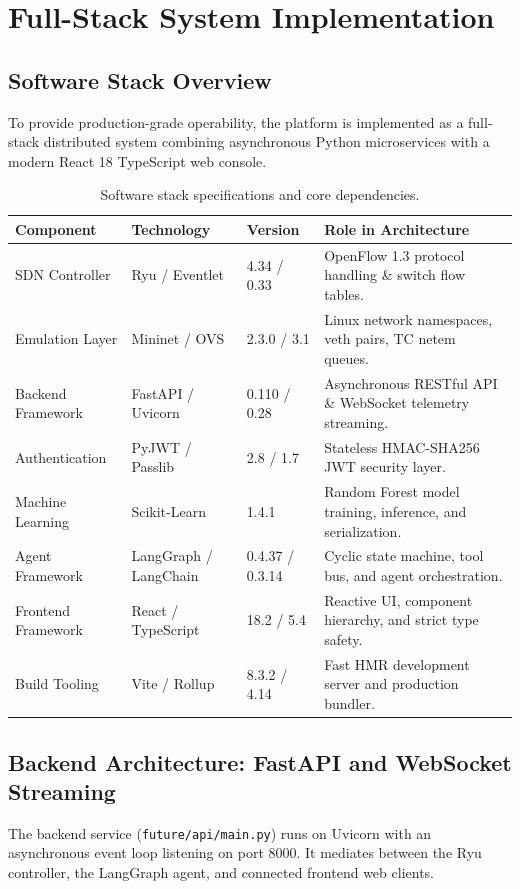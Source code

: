 \chapter{Full-Stack System Implementation}
\label{ch:implementation}

\section{Software Stack Overview}
To provide production-grade operability, the platform is implemented as a full-stack distributed system combining asynchronous Python microservices with a modern React 18 TypeScript web console.

\begin{table}[H]
  \centering
  \small
  \caption{Software stack specifications and core dependencies.}
  \label{tab:software_stack}
  \begin{tabularx}{\textwidth}{l l p{3.2cm} X}
    \toprule
    \textbf{Component} & \textbf{Technology} & \textbf{Version} & \textbf{Role in Architecture} \\
    \midrule
    SDN Controller & Ryu / Eventlet & 4.34 / 0.33 & OpenFlow 1.3 protocol handling \& switch flow tables. \\
    Emulation Layer & Mininet / OVS & 2.3.0 / 3.1 & Linux network namespaces, veth pairs, TC netem queues. \\
    Backend Framework & FastAPI / Uvicorn & 0.110 / 0.28 & Asynchronous RESTful API \& WebSocket telemetry streaming. \\
    Authentication & PyJWT / Passlib & 2.8 / 1.7 & Stateless HMAC-SHA256 JWT security layer. \\
    Machine Learning & Scikit-Learn & 1.4.1 & Random Forest model training, inference, and serialization. \\
    Agent Framework & LangGraph / LangChain & 0.4.37 / 0.3.14 & Cyclic state machine, tool bus, and agent orchestration. \\
    Frontend Framework & React / TypeScript & 18.2 / 5.4 & Reactive UI, component hierarchy, and strict type safety. \\
    Build Tooling & Vite / Rollup & 8.3.2 / 4.14 & Fast HMR development server and production bundler. \\
    \bottomrule
  \end{tabularx}
\end{table}

\section{Backend Architecture: FastAPI and WebSocket Streaming}
The backend service (\texttt{future/api/main.py}) runs on Uvicorn with an asynchronous event loop listening on port 8000. It mediates between the Ryu controller, the LangGraph agent, and connected frontend web clients.

